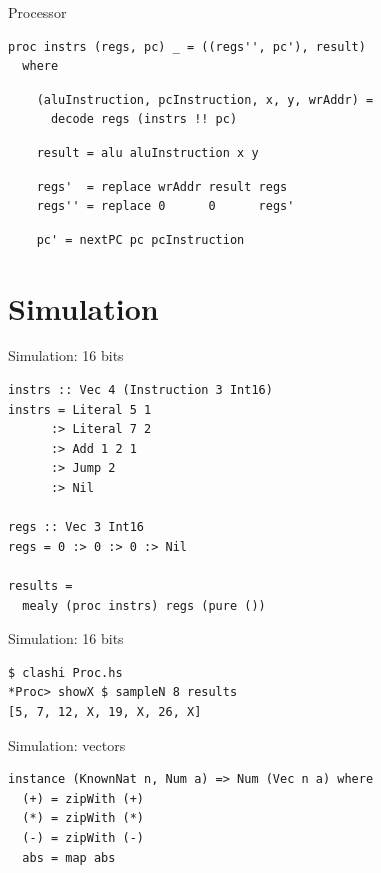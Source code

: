 \documentclass[10pt]{beamer}
\begin{document}
\begin{frame}[fragile]{Processor}
  \begin{verbatim}
proc instrs (regs, pc) _ = ((regs'', pc'), result)
  where
\end{verbatim}
  \pause
\begin{verbatim}    
    (aluInstruction, pcInstruction, x, y, wrAddr) = 
      decode regs (instrs !! pc)
  \end{verbatim}
\pause
  \begin{verbatim}
    result = alu aluInstruction x y
  \end{verbatim}
  \pause
  \begin{verbatim}
    regs'  = replace wrAddr result regs
    regs'' = replace 0      0      regs'
  \end{verbatim}
  \pause
  \begin{verbatim}
    pc' = nextPC pc pcInstruction
  \end{verbatim}
\end{frame}

\section{Simulation}

\begin{frame}[fragile]{Simulation: 16 bits}
  \begin{verbatim}
instrs :: Vec 4 (Instruction 3 Int16)
instrs = Literal 5 1
      :> Literal 7 2
      :> Add 1 2 1
      :> Jump 2
      :> Nil
  
regs :: Vec 3 Int16
regs = 0 :> 0 :> 0 :> Nil
  
results =
  mealy (proc instrs) regs (pure ())
  \end{verbatim}
\end{frame}

\begin{frame}[fragile]{Simulation: 16 bits}
\begin{verbatim}
$ clashi Proc.hs 
*Proc> showX $ sampleN 8 results
[5, 7, 12, X, 19, X, 26, X]
\end{verbatim}
\end{frame}

\begin{frame}[fragile]{Simulation: vectors}
\begin{verbatim}
instance (KnownNat n, Num a) => Num (Vec n a) where
  (+) = zipWith (+)
  (*) = zipWith (*)
  (-) = zipWith (-)
  abs = map abs
\end{verbatim}
\end{frame}
\end{document}
